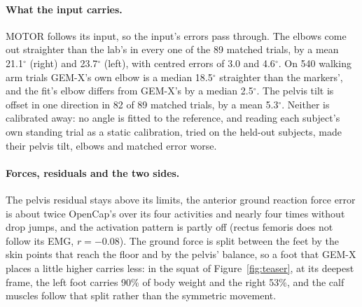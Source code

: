 \documentclass[11pt]{article}
\newcommand{\dg}{\ensuremath{^\circ}}
\begin{document}
\paragraph{What the input carries.} MOTOR follows its input, so the input's errors pass through. The elbows come out
straighter than the lab's in every one of the 89 matched trials, by a mean 21.1\dg{} (right) and 23.7\dg{} (left),
with centred errors of 3.0 and 4.6\dg. On 540 walking arm trials GEM-X's own elbow is a median 18.5\dg{} straighter
than the markers', and the fit's elbow differs from GEM-X's by a median 2.5\dg. The pelvis tilt is offset in one
direction in 82 of 89 matched trials, by a mean 5.3\dg. Neither is calibrated away: no angle is fitted to the
reference, and reading each subject's own standing trial as a static calibration, tried on the held-out subjects, made
their pelvis tilt, elbows and matched error worse.

\paragraph{Forces, residuals and the two sides.} The pelvis residual stays above its limits, the anterior ground
reaction force error is about twice OpenCap's over its four activities and nearly four times without drop jumps, and the activation pattern is partly off (rectus femoris does not
follow its EMG, $r=-0.08$). The ground force is split between the feet by the skin points that reach the floor and by
the pelvis' balance, so a foot that GEM-X places a little higher carries less: in the squat of
Figure~\ref{fig:teaser}, at its deepest frame, the left foot carries 90\% of body weight and the right 53\%, and the
calf muscles follow that split rather than the symmetric movement.
\end{document}
